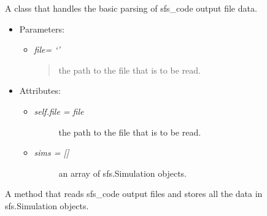\documentclass[letterpaper,10pt,english]{sphinxmanual}
\begin{document}
\begin{fulllineitems}
\label{index:readsfs.FileData}
A class that handles the basic parsing of sfs\_code output file
data.
\begin{itemize}
\item {} 
Parameters:
\begin{itemize}
\item {} 
\emph{file= `'}
\begin{quote}

the path to the file that is to be read.
\end{quote}

\end{itemize}

\item {} 
Attributes:
\begin{itemize}
\item {} \begin{description}
\item[{\emph{self.file = file}}] \leavevmode
the path to the file that is to be read.

\end{description}

\item {} \begin{description}
\item[{\emph{sims = {[}{]}}}] \leavevmode
an array of sfs.Simulation objects.

\end{description}

\end{itemize}

\end{itemize}

\begin{fulllineitems}
\label{index:readsfs.FileData.get_sims}
A method that reads sfs\_code output files and stores all the data in
sfs.Simulation objects.

\end{fulllineitems}


\end{fulllineitems}

\end{document}
